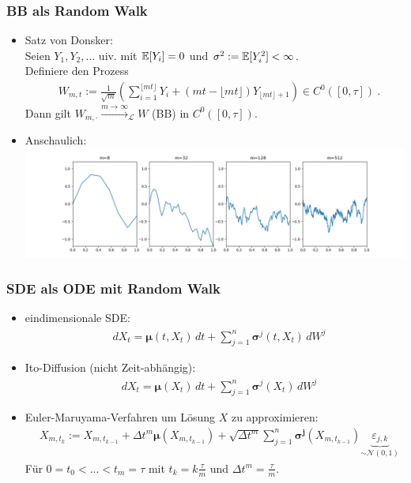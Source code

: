 \begin{frame}
	\frametitle{BB als Random Walk}
	\begin{itemize}
		\item Satz von Donsker:\\
		Seien $Y_1,Y_2,...$ uiv. mit $\mathbb{E}[Y_i]=0$ und $\sigma^2 := \mathbb{E}[Y_i^2] < \infty$.\\
		Definiere den Prozess
		\begin{align*}
		& W_{m,t} := \frac{1}{\sqrt{m}} \left( \sum\limits_{i=1}^{\lfloor mt \rfloor} Y_i + (mt - \lfloor mt \rfloor) Y_{\lfloor mt \rfloor +1}\right) \in C^0([0,\tau]) \ .
		\end{align*}
		Dann gilt $W_{m,\cdot} \xrightarrow{m \rightarrow \infty}_{\mathcal{L}} W$ (BB) in $C^0([0,\tau])$.
		
		\item Anschaulich:\\
		\includegraphics[scale=0.25]{Ben/DonskerBilder.png}
	\end{itemize}
	
\end{frame}


\begin{frame}
	\frametitle{SDE als ODE mit Random Walk}
	\begin{itemize}
		\item eindimensionale SDE:
		\begin{align*}
		& dX_t = \bm{\mu}(t,X_t) \, dt + \sum\limits_{j=1}^n \bm{\sigma}^{j}(t,X_t) \, dW^j
		\end{align*}
		\item Ito-Diffusion (nicht Zeit-abhängig):
		\begin{align*}
		& dX_t = \bm{\mu}(X_t) \, dt + \sum\limits_{j=1}^n \bm{\sigma}^{j}(X_t) \, dW^j
		\end{align*}
		\item Euler-Maruyama-Verfahren um Lösung $X$ zu approximieren:
		\begin{align*}
		& X_{m,t_k} := X_{m,t_{k-1}} + \Delta t^m \bm{\mu}(X_{m,t_{k-1}}) + \sqrt{\Delta t^m} \sum\limits_{j=1}^n \bm{\sigma^j}(X_{m,t_{k-1}}) \underbrace{\varepsilon_{j,k}}_{\sim \mathcal{N}(0,1)}
		\end{align*}
		Für $0=t_0<...<t_m=\tau$ mit $t_k = k \frac{\tau}{m}$ und $\Delta t^m = \frac{\tau}{m}$.
	\end{itemize}
	
\end{frame}


